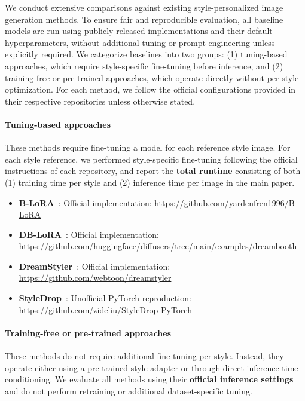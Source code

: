 \documentclass[10pt,twocolumn,letterpaper]{article}
\begin{document}
We conduct extensive comparisons against existing style-personalized image generation methods. To ensure fair and reproducible evaluation, all baseline models are run using publicly released implementations and their default hyperparameters, without additional tuning or prompt engineering unless explicitly required. We categorize baselines into two groups:
(1) tuning-based approaches, which require style-specific fine-tuning before inference, and
(2) training-free or pre-trained approaches, which operate directly without per-style optimization.
For each method, we follow the official configurations provided in their respective repositories unless otherwise stated.

\paragraph{Tuning-based approaches}
These methods require fine-tuning a model for each reference style image. For each style reference, we performed style-specific fine-tuning following the official instructions of each repository, and report the \textbf{total runtime} consisting of both (1) training time per style and (2) inference time per image in the main paper.

\begin{itemize}
	\item \textbf{B-LoRA}~\cite{frenkel2024implicitstylecontentseparationusing}:  
	Official implementation: \url{https://github.com/yardenfren1996/B-LoRA}
	
	\item \textbf{DB-LoRA}~\cite{ryu2023low}:  
	Official implementation: \url{https://github.com/huggingface/diffusers/tree/main/examples/dreambooth}
	
	\item \textbf{DreamStyler}~\cite{ahn2024dreamstyler}:  
	Official implementation: \url{https://github.com/webtoon/dreamstyler}
	
	\item \textbf{StyleDrop}~\cite{sohn2023styledrop}:  
	Unofficial PyTorch reproduction: \url{https://github.com/zideliu/StyleDrop-PyTorch}
\end{itemize}

\paragraph{Training-free or pre-trained approaches}
These methods do not require additional fine-tuning per style. Instead, they operate either using a pre-trained style adapter or through direct inference-time conditioning. We evaluate all methods using their \textbf{official inference settings} and do not perform retraining or additional dataset-specific tuning.
\end{document}
